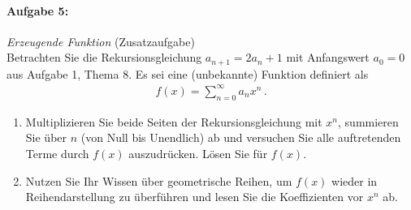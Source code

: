 \paragraph{Aufgabe 5: } \emph{Erzeugende Funktion} \hfill (Zusatzaufgabe)\\[0.2cm]
Betrachten Sie die Rekursionsgleichung $a_{n+1}=2a_n+1$ mit Anfangswert $a_0=0$ aus Aufgabe 1, Thema 8. Es sei eine (unbekannte) Funktion definiert als
\begin{align*}
f(x)=\sum\limits_{n=0}^\infty a_n x^n\,.
\end{align*}
\begin{enumerate}[label=(\alph*)]
\item Multiplizieren Sie beide Seiten der Rekursionsgleichung mit $x^n$, summieren Sie über $n$ (von Null bis Unendlich) ab und versuchen Sie alle auftretenden Terme durch $f(x)$ auszudrücken. Lösen Sie für $f(x)$.
\item Nutzen Sie Ihr Wissen über geometrische Reihen, um $f(x)$ wieder in Reihendarstellung zu überführen und lesen Sie die Koeffizienten vor $x^n$ ab.
\end{enumerate}
%
%